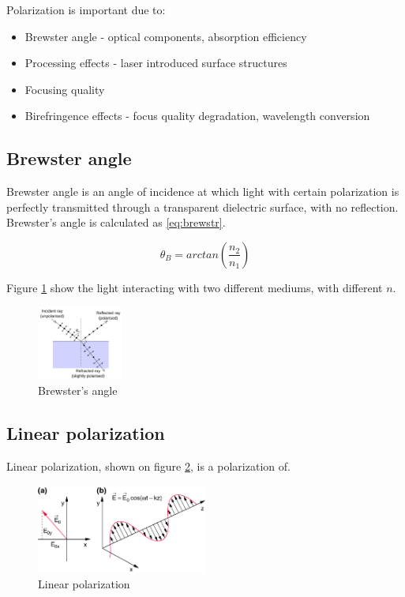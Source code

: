 Polarization is important due to:
\begin{itemize}
    \item Brewster angle - optical components, absorption efficiency
    \item Processing effects - laser introduced surface structures
    \item Focusing quality
    \item Birefringence effects - focus quality degradation, wavelength conversion
\end{itemize}

\subsection{Brewster angle}
Brewster angle is an angle of incidence at which light with certain polarization is 
perfectly transmitted through a transparent dielectric surface, with no reflection.
Brewster's angle is calculated as \ref{eq:brewstr}. 

\begin{equation}
    \theta_B = arctan(\frac{n_2}{n_1})
    \label{eq:brewstr}
\end{equation}

Figure \ref{fig:brewstr} show the light interacting with two different mediums, with different $n$.
\begin{figure}[h!]
    \centering
    \includegraphics[width=0.25\textwidth]{slike/Brewsters-angle.svg.png}
    \caption{Brewster's angle }
    \label{fig:brewstr}
\end{figure}

\subsection{Linear polarization}
Linear polarization, shown on figure \ref{fig:linpol}, is a polarization of.

\begin{figure}[h!]
    \centering
    \includegraphics[width=0.5\textwidth]{slike/linpol.png}
    \caption{Linear polarization}
    \label{fig:linpol}
\end{figure}

